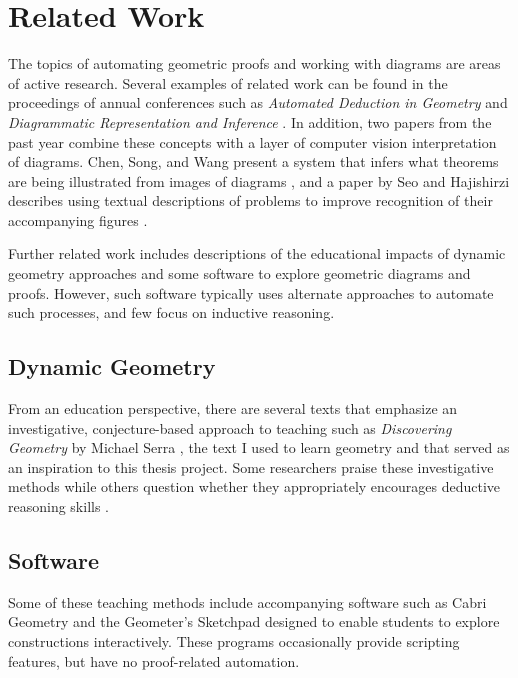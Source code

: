 \chapter{Related Work}
\label{chap:related-work}

The topics of automating geometric proofs and working with diagrams
are areas of active research.  Several examples of related work can be
found in the proceedings of annual conferences such as \emph{Automated
  Deduction in Geometry} \cite{autoDeduction} and \emph {Diagrammatic
  Representation and Inference} \cite{diagramInference}.  In addition,
two papers from the past year combine these concepts with a layer of
computer vision interpretation of diagrams.  Chen, Song, and Wang
present a system that infers what theorems are being illustrated from
images of diagrams \cite{fromImages}, and a paper by Seo and
Hajishirzi describes using textual descriptions of problems to improve
recognition of their accompanying figures \cite{diagramUnderstanding}.

Further related work includes descriptions of the educational impacts
of dynamic geometry approaches and some software to explore geometric
diagrams and proofs.  However, such software typically uses alternate
approaches to automate such processes, and few focus on inductive
reasoning.

\section{Dynamic Geometry}
From an education perspective, there are several texts that emphasize
an investigative, conjecture-based approach to teaching such as
\emph{Discovering Geometry} by Michael Serra \cite{serraDiscovering},
the text I used to learn geometry and that served as an inspiration to
this thesis project.  Some researchers praise these investigative
methods \cite{geoTransformations} while others question whether they
appropriately encourages deductive reasoning skills
\cite{geoTeaching}.

\section{Software}
Some of these teaching methods include accompanying software such as
Cabri Geometry \cite{cabri} and the Geometer's Sketchpad
\cite{geoSketchpad} designed to enable students to explore
constructions interactively.  These programs occasionally provide
scripting features, but have no proof-related automation.

